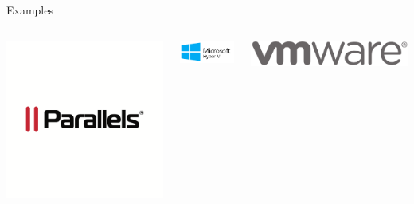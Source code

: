 \documentclass[12pt]{beamer}
\begin{document}
\begin{frame}{Examples}
  \begin{columns}
    \begin{column}{0.33\linewidth}
      \begin{center}
        \includegraphics[width=0.8\linewidth]{parallels}
      \end{center}
    \end{column}
    \begin{column}{0.33\linewidth}
      \includegraphics[width=\linewidth]{hyperv}
    \end{column}
    \begin{column}{0.33\linewidth}
      \includegraphics[width=\linewidth]{vmware}
    \end{column}

\end{columns}
\end{frame}
\end{document}
